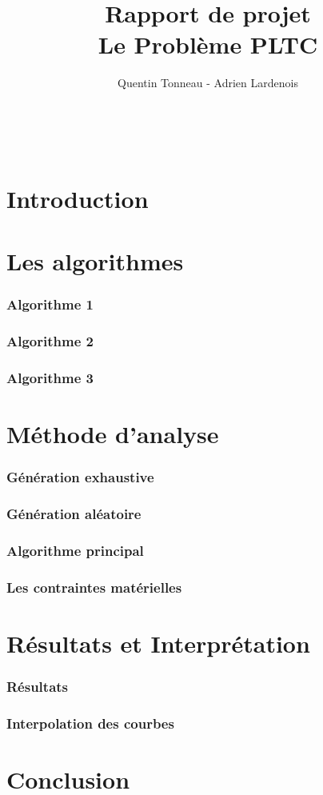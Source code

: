 \documentclass[a4paper,11pt,twoside]{report}
\title {Rapport de projet \\ Le Problème PLTC}
\author {Quentin Tonneau - Adrien Lardenois}
\date{}
\begin{document}
\pagestyle{plain}
\renewcommand\labelitemi{$\circ$}
\renewcommand\labelitemii{$\bullet$}
\tableofcontents
\newpage
\thispagestyle{empty} ~

{

	\fancyhead{}
	\fancyfoot{}
	\lfoot[\thepage]{}
	\rfoot[]{\thepage}
}

\part{Introduction}
 
\part{Les algorithmes}
  \section{Algorithme 1}
  \section{Algorithme 2}
  \section{Algorithme 3}
\part{Méthode d'analyse}
   \section{Génération exhaustive}
      
   \section{Génération aléatoire}
      
   \section{Algorithme principal}
      
   \section{Les contraintes matérielles}
      
\part{Résultats et Interprétation}
  \section{Résultats}
  \section{Interpolation des courbes}
\part{Conclusion}
\end{document}
